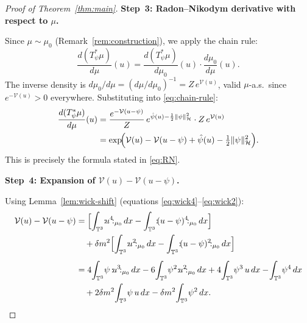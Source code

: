 \documentclass[11pt,a4paper]{article}
\theoremstyle{plain}
\theoremstyle{definition}
\newcommand{\T}{\mathbb{T}}
\newcommand{\cH}{\mathcal{H}}
\newcommand{\cV}{\mathcal{V}}
\newcommand{\norm}[1]{\|#1\|}
\newcommand{\wick}[1]{\mathopen{:}\!#1\!\mathclose{:}}
\begin{document}
\begin{proof}[Proof of Theorem~\ref{thm:main}]
\medskip\noindent
\textbf{Step~3: Radon--Nikodym derivative with respect to $\mu$.}

Since $\mu \sim \mu_0$ (Remark~\ref{rem:construction}), we apply the chain rule:
\begin{equation}\label{eq:chain-rule}
  \frac{d(T_\psi^*\mu)}{d\mu}(u)
  = \frac{d(T_\psi^*\mu)}{d\mu_0}(u)
    \cdot\frac{d\mu_0}{d\mu}(u).
\end{equation}
The inverse density is $d\mu_0/d\mu = (d\mu/d\mu_0)^{-1} = Z\,e^{\cV(u)}$,
valid $\mu$-a.s.\ since $e^{-\cV(u)}>0$ everywhere.
Substituting into \eqref{eq:chain-rule}:
\begin{align}
  \frac{d(T_\psi^*\mu)}{d\mu}(u)
  &= \frac{e^{-\cV(u-\psi)}}{Z}\,e^{\hat\psi(u)-\frac{1}{2}\norm\psi_\cH^2}
     \cdot Z\,e^{\cV(u)} \notag\\
  &= \exp\!\Bigl(\cV(u)-\cV(u-\psi)+\hat\psi(u)-\tfrac{1}{2}\norm\psi_\cH^2\Bigr).
  \label{eq:RN-explicit}
\end{align}
This is precisely the formula stated in \eqref{eq:RN}.

\medskip\noindent
\textbf{Step~4: Expansion of $\cV(u)-\cV(u-\psi)$.}

Using Lemma~\ref{lem:wick-shift} (equations \eqref{eq:wick4}--\eqref{eq:wick2}):
\begin{align}
  \cV(u)-\cV(u-\psi)
  &= \Bigl[\int_{\T^3}\wick{u^4}_{\mu_0}\,dx
           - \int_{\T^3}\wick{(u-\psi)^4}_{\mu_0}\,dx\Bigr] \notag\\
  &\quad + \delta m^2\Bigl[\int_{\T^3}\wick{u^2}_{\mu_0}\,dx
           - \int_{\T^3}\wick{(u-\psi)^2}_{\mu_0}\,dx\Bigr] \notag\\[4pt]
  &= 4\!\int_{\T^3}\!\psi\,\wick{u^3}_{\mu_0}\,dx
     - 6\!\int_{\T^3}\!\psi^2\wick{u^2}_{\mu_0}\,dx
     + 4\!\int_{\T^3}\!\psi^3\,u\,dx
     - \!\int_{\T^3}\!\psi^4\,dx \notag\\
  &\quad + 2\delta m^2\!\int_{\T^3}\!\psi\,u\,dx
     - \delta m^2\!\int_{\T^3}\!\psi^2\,dx.
  \label{eq:V-diff}
\end{align}


\end{proof}
\end{document}
